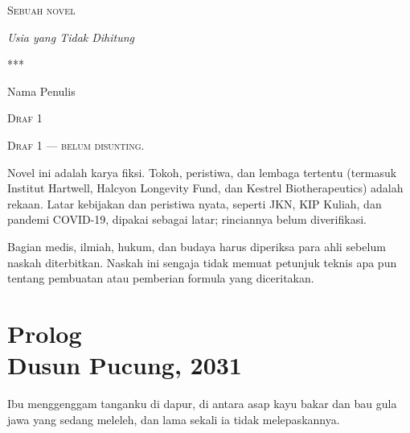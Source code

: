 \documentclass[11pt,twoside,openany]{book}
\begin{document}
\frontmatter
\pagestyle{empty}
\begin{titlepage}
\centering
\vspace*{26mm}
{\small\textsc{Sebuah novel}\par}
\vspace{10mm}
{\fontsize{30}{34}\selectfont\itshape Usia yang Tidak Dihitung\par}
\vspace{10mm}
{\small\textsc{*\hspace{0.7em}*\hspace{0.7em}*}\par}
\vfill
{\large Nama Penulis\par}
\vspace{8mm}
{\footnotesize\textsc{Draf 1}\par}
\vspace{14mm}
\end{titlepage}
\cleardoublepage
\thispagestyle{empty}
\vspace*{\fill}
\begin{center}\footnotesize
\begin{minipage}{0.82\textwidth}\raggedright\setlength{\parindent}{0pt}\setlength{\parskip}{0.6em}
\textsc{Draf 1 — belum disunting.}

Novel ini adalah karya fiksi. Tokoh, peristiwa, dan lembaga tertentu (termasuk
Institut Hartwell, Halcyon Longevity Fund, dan Kestrel Biotherapeutics) adalah rekaan.
Latar kebijakan dan peristiwa nyata, seperti JKN, KIP Kuliah, dan pandemi COVID-19,
dipakai sebagai latar; rinciannya belum diverifikasi.

Bagian medis, ilmiah, hukum, dan budaya harus diperiksa para ahli sebelum naskah diterbitkan.
Naskah ini sengaja tidak memuat petunjuk teknis apa pun tentang pembuatan atau
pemberian formula yang diceritakan.
\end{minipage}
\end{center}
\vspace*{\fill}
\clearpage
\pagestyle{fancy}
\tableofcontents
\mainmatter

\chapter*{Prolog\\[0.5em]\normalsize\upshape Dusun Pucung, 2031}
Ibu menggenggam tanganku di dapur, di antara asap kayu bakar dan bau gula jawa yang sedang meleleh, dan lama sekali ia tidak melepaskannya.
\end{document}
